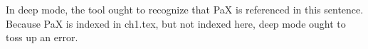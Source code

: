 
In deep mode, the tool ought to recognize that PaX is referenced in
this sentence.  Because PaX is indexed in ch1.tex, but not indexed
here, deep mode ought to toss up an error.



